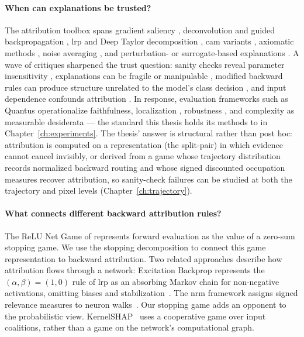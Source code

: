 \paragraph{When can explanations be trusted?}
The attribution toolbox spans gradient saliency \parencite{Simonyan2014}, deconvolution and guided backpropagation \parencite{ZeilerFergus2014,Springenberg2015}, \ac{lrp} and Deep Taylor decomposition \parencite{Bach2015,Montavon2017DeepTaylor,Montavon2018}, \ac{cam} variants \parencite{Selvaraju2017,Chattopadhay2018,Jiang2021LayerCAM}, axiomatic methods \parencite{Sundararajan2017,Shrikumar2017}, noise averaging \parencite{Smilkov2017}, and perturbation- or surrogate-based explanations \parencite{Ribeiro2016,FongVedaldi2017,LundbergLee2017,Kolek2023_ShearletX,Fel2023_EVA}. A wave of critiques sharpened the trust question: sanity checks reveal parameter insensitivity \parencite{Adebayo2018sanity}, explanations can be fragile or manipulable \parencite{Ghorbani2019fragile,Dombrowski2019ManipulatedExplanations,AlvarezMelis2018robustness}, modified backward rules can produce structure unrelated to the model's class decision \parencite{Nie2018guided,sixt2020whenexplanationslie}, and input dependence confounds attribution \parencite{Kindermans2018PatternAttribution}. In response, evaluation frameworks such as Quantus \parencite{Hedstrom2023} operationalize faithfulness, localization \parencite{Zhang2018pointinggame}, robustness \parencite{Yeh2019}, and complexity \parencite{Bhatt2020} as measurable desiderata --- the standard this thesis holds its methods to in Chapter~\ref{ch:experiments}. The thesis' answer is structural rather than post hoc: attribution is computed on a representation (the split-pair) in which evidence cannot cancel invisibly, or derived from a game whose trajectory distribution records normalized backward routing and whose signed discounted occupation measures recover attribution, so sanity-check failures can be studied at both the trajectory and pixel levels (Chapter~\ref{ch:trajectory}).

\paragraph{What connects different backward attribution rules?}
The ReLU Net Game of \textcite{Gaubert2025} represents forward evaluation as the value of a zero-sum stopping game. We use the stopping decomposition to connect this game representation to backward attribution. Two related approaches describe how attribution flows through a network: Excitation Backprop represents the $(\alpha,\beta)=(1,0)$ rule of \ac{lrp} as an absorbing Markov chain for non-negative activations, omitting biases and stabilization~\parencite{Zhang2018pointinggame}. The \ac{nrm} framework assigns signed relevance measures to neuron walks~\parencite{Xiong2026nrm}. Our stopping game adds an opponent to the probabilistic view. KernelSHAP~\parencite{LundbergLee2017} uses a cooperative game over input coalitions, rather than a game on the network's computational graph.


